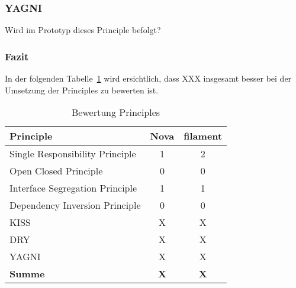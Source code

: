\subsubsection{YAGNI}
Wird im Prototyp dieses Principle befolgt?

\subsubsection{Fazit}
In der folgenden Tabelle~\ref{tab:bewertung-principles} wird ersichtlich, dass XXX insgesamt besser bei der Umsetzung der Principles zu bewerten ist.

\begin{table}[]
    \caption{Bewertung Principles}
    \label{tab:bewertung-principles}
    \centering
    \begin{tabular}{|l|c|c|}
        \hline
        \textbf{Principle}              & \textbf{Nova} & \textbf{filament} \\ \hline
        Single Responsibility Principle & 1             & 2                 \\ \hline
        Open Closed Principle           & 0             & 0                 \\ \hline
        Interface Segregation Principle & 1             & 1                 \\ \hline
        Dependency Inversion Principle  & 0             & 0                 \\ \hline
        KISS                            & X             & X                 \\ \hline
        DRY                             & X             & X                 \\ \hline
        YAGNI                           & X             & X                 \\ \hline
        \textbf{Summe}                  & \textbf{X}    & \textbf{X}        \\ \hline
    \end{tabular}
\end{table}

\color{black}
